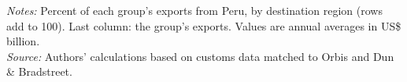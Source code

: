 \documentclass[11pt,a4paper]{article}
\begin{document}
\begin{table}[H]\centering\small%
  \caption{Peru, Other Goods: Multinational Exports by Parent Region and Destination Region}%
  \label{tab:c_reg_PER_rest}%
  \par\vspace{3pt}%
  \begin{minipage}{0.95\textwidth}\footnotesize %
  \textit{Notes:} Percent of each group's exports from Peru, by destination region (rows add to 100). Last column: the group's exports. Values are annual averages in US\$ billion.\\[3pt]%
  \textit{Source:} Authors' calculations based on customs data matched to Orbis and Dun \& Bradstreet.%
  \end{minipage}%
  \end{table}
\end{document}
